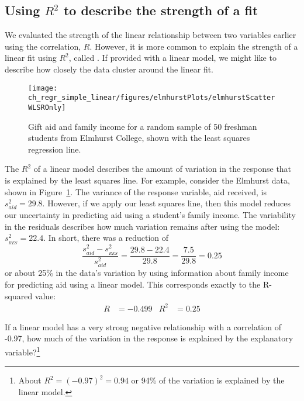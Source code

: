
\subsection{Using $R^2$ to describe the strength of a fit}


We evaluated the strength of the linear relationship between two variables earlier using the correlation, $R$. However, it is more common to explain the strength of a linear fit using $R^2$, called . If provided with a linear model, we might like to describe how closely the data cluster around the linear fit.

\begin{figure}
\centering
\texttt{[image: ch\_regr\_simple\_linear/figures/elmhurstPlots/elmhurstScatterWLSROnly]}
\caption{Gift aid and family income for a random sample of 50 freshman students from Elmhurst College, shown with the least squares regression line.}
\label{elmhurstScatterWLSROnly}
\end{figure}

The $R^2$ of a linear model describes the amount of variation in the response that is explained by the least squares line. For example, consider the Elmhurst data, shown in Figure~\ref{elmhurstScatterWLSROnly}. The variance of the response variable, aid received, is $s_{aid}^2=29.8$. However, if we apply our least squares line, then this model reduces our uncertainty in predicting aid using a student's family income. The variability in the residuals describes how much variation remains after using the model: $s_{_{RES}}^2 = 22.4$. In short, there was a reduction of
$$\frac{s_{aid}^2 - s_{_{RES}}^2}{s_{aid}^2}
	= \frac{29.8 - 22.4}{29.8} = \frac{7.5}{29.8}
	= 0.25$$
or about  25\% in the data's variation by using information about family income for predicting aid using a linear model. This corresponds exactly to the R-squared value:
\begin{align*}
R &= -0.499 &R^2 &= 0.25
\end{align*}

\begin{exercise}
If a linear model has a very strong negative relationship with a correlation of -0.97, how much of the variation in the response is explained by the explanatory variable?\footnote{About $R^2 = (-0.97)^2 = 0.94$ or 94\% of the variation is explained by the linear model.}
\end{exercise}

